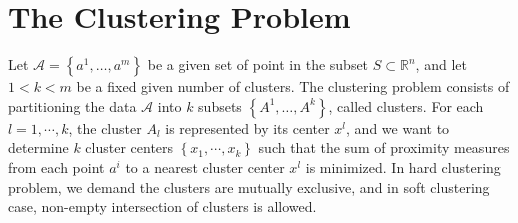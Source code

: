 \documentclass[11pt]{article}
\numberwithin{equation}{section}
\begin{document}
%
%
%
%
%
%

\newpage

\section{The Clustering Problem}

Let $\mathcal{A}= \left\lbrace a^1, \dots ,a^m \right\rbrace$ be a given set of point in the subset $\textit{S} \subset \mathbb{R}^n$, and let $1 < k < m$ be a fixed given number of clusters. The clustering problem consists of partitioning the data $\mathcal{A}$ into $k$ subsets $\left\lbrace A^1, \dots ,A^k \right\rbrace$, called clusters. For each $l=1, \cdots ,k$, the cluster $A_l$ is represented by its center $x^l$, and we want to determine $k$ cluster centers $\left\lbrace x_1, \cdots ,x_k \right\rbrace$ such that the sum of proximity measures from each point $a^i$ to a nearest cluster center $x^l$ is minimized. In hard clustering problem, we demand the clusters are mutually exclusive, and in soft clustering case, non-empty intersection of clusters is allowed.
\end{document}
